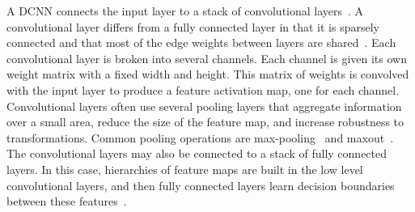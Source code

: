     A DCNN connects the input layer to a stack of convolutional
      layers~\cite{krizhevsky_imagenet_2012}.
    A convolutional layer differs from a fully connected layer in that
      it is sparsely connected and that most of the edge weights between
      layers are shared~\cite{lecun_gradientbased_1998,
      fukushima_neocognitron_1988, serre_robust_2007}.
    Each convolutional layer is broken into several channels.
    Each channel is given its own weight matrix with a fixed width and
      height.
    This matrix of weights is convolved with the input layer to produce
      a feature activation map, one for each channel.
    Convolutional layers often use several pooling layers that
      aggregate information over a small area, reduce the size of the
      feature map, and increase robustness to transformations.
    Common pooling operations are max-pooling~\cite{serre_robust_2007,
      krizhevsky_imagenet_2012} and maxout~\cite{goodfellow_maxout_2013}.
    The convolutional layers may also be connected to a stack of fully
      connected layers.
    In this case, hierarchies of feature maps are built in the low
      level convolutional layers, and then fully connected layers learn
      decision boundaries between these
      features~\cite{zeiler_visualizing_2014}.


